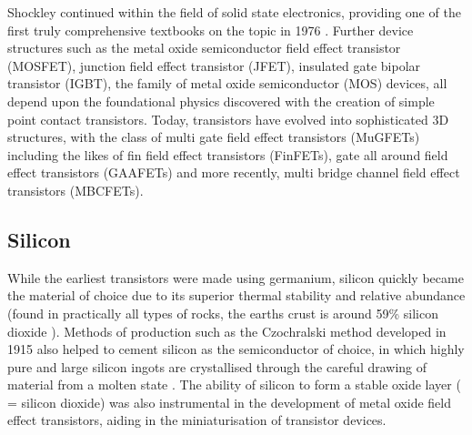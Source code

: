 \begin{refsection}
Shockley continued within the field of solid state electronics, providing one of the first truly comprehensive textbooks on the topic in 1976 \cite{Shockley1976-hp}. Further device structures such as the metal oxide semiconductor field effect transistor (MOSFET), junction field effect transistor (JFET), insulated gate bipolar transistor (IGBT), the family of metal oxide semiconductor (MOS) devices, all depend upon the foundational physics discovered with the creation of simple point contact transistors. Today, transistors have evolved into sophisticated 3D structures, with the class of multi gate field effect transistors (MuGFETs) including the likes of fin field effect transistors (FinFETs), gate all around field effect transistors (GAAFETs) and more recently, multi bridge channel field effect transistors (MBCFETs). 

\subsection{Silicon} 
While the earliest transistors were made using germanium, silicon quickly became the material of choice due to its superior thermal stability and relative abundance (found in practically all types of rocks, the earths crust is around 59\% silicon dioxide \cite{usgs2002rare}). Methods of production such as the Czochralski method developed in 1915 also helped to cement silicon as the semiconductor of choice, in which highly pure and large silicon ingots are crystallised through the careful drawing of material from a molten state \cite{Sangwal2013}. The ability of silicon to form a stable oxide layer ( = silicon dioxide) was also instrumental in the development of metal oxide field effect transistors, aiding in the miniaturisation of transistor devices.

\end{refsection}
